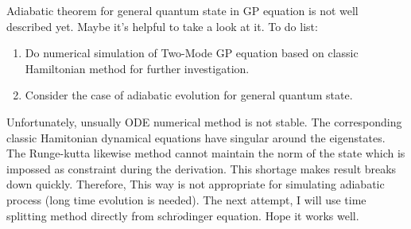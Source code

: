 \documentclass[fontsize=11pt, %
                             paper=a4, %
                             twoside, %
                             captions=tableheading,
                             index=totoc,
                             hyperref]{labbook}
\begin{document}
\begin{addmargin}[4cm]{0cm}
Adiabatic theorem for general quantum state in GP equation is not well described yet. Maybe it's helpful to take a look at it.
To do list:
\begin{enumerate}
\item Do numerical simulation of Two-Mode GP equation based on classic Hamiltonian method for further investigation.
\item Consider the case of adiabatic evolution for general quantum state.
\end{enumerate}
Unfortunately, unsually ODE numerical method is not stable. The corresponding classic Hamitonian dynamical equations have singular around the eigenstates. The Runge-kutta likewise method cannot maintain the norm of the state which is impossed as constraint during the derivation. This shortage makes result breaks down quickly. Therefore, This way is not appropriate for simulating adiabatic process (long time evolution is needed). The next attempt, I will use time splitting method directly from schr$\ddot{o}$dinger equation. Hope it works well.


\end{addmargin}
\end{document}
